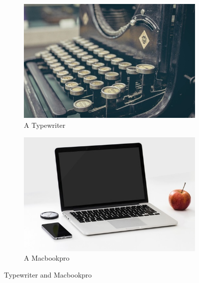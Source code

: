 \begin{figure}[H]
        \centering
        \begin{subfigure}[b]{0.4\textwidth}
                \includegraphics[width=\textwidth]{imgs/typewriter.jpg}
                \caption{A Typewriter}
                \label{fig:typewriter}
        \end{subfigure}
        \begin{subfigure}[b]{0.4\textwidth}
                \includegraphics[width=\textwidth]{imgs/macbookpro.jpg}
                \caption{A Macbookpro}
                \label{fig:macbookpro}
        \end{subfigure}
        \caption{Typewriter and Macbookpro}\label{fig:typewriter_macbookpro}
\end{figure}
